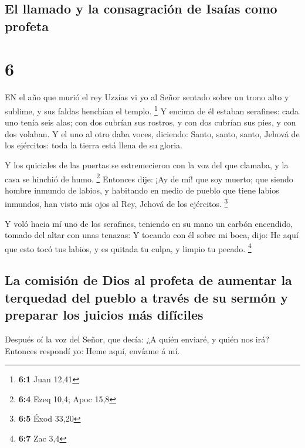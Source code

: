\hypertarget{el-llamado-y-la-consagraciuxf3n-de-isauxedas-como-profeta}{%
\subsection{El llamado y la consagración de Isaías como
profeta}\label{el-llamado-y-la-consagraciuxf3n-de-isauxedas-como-profeta}}

\hypertarget{section-5}{%
\section{6}\label{section-5}}

 EN el año que murió el rey Uzzías vi yo al Señor sentado
sobre un trono alto y sublime, y sus faldas henchían el templo.
\footnote{\textbf{6:1} Juan 12,41}  Y encima de él estaban
serafines: cada uno tenía seis alas; con dos cubrían sus rostros, y con
dos cubrían sus pies, y con dos volaban.  Y el uno al otro
daba voces, diciendo: Santo, santo, santo, Jehová de los ejércitos: toda
la tierra está llena de su gloria.

 Y los quiciales de las puertas se estremecieron con la voz
del que clamaba, y la casa se hinchió de humo. \footnote{\textbf{6:4}
  Ezeq 10,4; Apoc 15,8}  Entonces dije: ¡Ay de mí! que soy
muerto; que siendo hombre inmundo de labios, y habitando en medio de
pueblo que tiene labios inmundos, han visto mis ojos al Rey, Jehová de
los ejércitos. \footnote{\textbf{6:5} Éxod 33,20}

 Y voló hacia mí uno de los serafines, teniendo en su mano
un carbón encendido, tomado del altar con unas tenazas:  Y
tocando con él sobre mi boca, dijo: He aquí que esto tocó tus labios, y
es quitada tu culpa, y limpio tu pecado. \footnote{\textbf{6:7} Zac 3,4}

\hypertarget{la-comisiuxf3n-de-dios-al-profeta-de-aumentar-la-terquedad-del-pueblo-a-travuxe9s-de-su-sermuxf3n-y-preparar-los-juicios-muxe1s-difuxedciles}{%
\subsection{La comisión de Dios al profeta de aumentar la terquedad del
pueblo a través de su sermón y preparar los juicios más
difíciles}\label{la-comisiuxf3n-de-dios-al-profeta-de-aumentar-la-terquedad-del-pueblo-a-travuxe9s-de-su-sermuxf3n-y-preparar-los-juicios-muxe1s-difuxedciles}}

 Después oí la voz del Señor, que decía: ¿A quién enviaré, y
quién nos irá? Entonces respondí yo: Heme aquí, envíame á mí.

